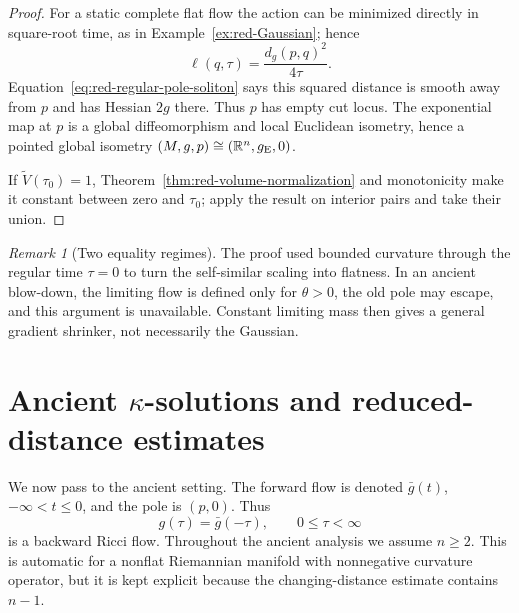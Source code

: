 \documentclass[10pt]{coll-l}
\theoremstyle{definition}
\theoremstyle{remark}
\newtheorem{remark}[theorem]{Remark}
\numberwithin{section}{chapter}
\numberwithin{equation}{chapter}
\begin{document}
\begin{proof}
For a static complete flat flow the action can be minimized directly in
square-root time, as in Example~\ref{ex:red-Gaussian}; hence
\begin{equation}
                         \ell(q,\tau)=\frac{d_g(p,q)^2}{4\tau}.
                                                               \label{eq:red-flat-reduced-distance}
\end{equation}
Equation~\eqref{eq:red-regular-pole-soliton} says this squared distance is
smooth away from $p$ and has Hessian $2g$ there.  Thus $p$ has empty cut
locus.  The exponential map at $p$ is a global diffeomorphism and local
Euclidean isometry, hence a pointed global isometry
$(M,g,p)\cong(\mathbb R^n,g_{\rm E},0)$.

If $\widetilde V(\tau_0)=1$, Theorem~\ref{thm:red-volume-normalization} and
monotonicity make it constant between zero and $\tau_0$; apply the result on
interior pairs and take their union.
\end{proof}

\begin{remark}[Two equality regimes]
\label{rem:red-two-rigidity-regimes}
The proof used bounded curvature through the regular time $\tau=0$ to turn
the self-similar scaling into flatness.  In an ancient blow-down, the limiting
flow is defined only for $\theta>0$, the old pole may escape, and this
argument is unavailable.  Constant limiting mass then gives a general
gradient shrinker, not necessarily the Gaussian.
\end{remark}

\section[Ancient kappa-solutions and reduced distance]
{Ancient \texorpdfstring{$\kappa$}{kappa}-solutions and reduced-distance
estimates}
\label{sec:red-kappa}

We now pass to the ancient setting.  The forward flow is denoted
$\bar g(t)$, $-\infty<t\leq0$, and the pole is $(p,0)$.  Thus
\begin{equation}
                         g(\tau)=\bar g(-\tau),
                         \qquad 0\leq\tau<\infty         \label{eq:red-ancient-backward-flow}
\end{equation}
is a backward Ricci flow.
Throughout the ancient analysis we assume $n\geq2$.  This is automatic for
a nonflat Riemannian manifold with nonnegative curvature operator, but it is
kept explicit because the changing-distance estimate contains $n-1$.
\end{document}
